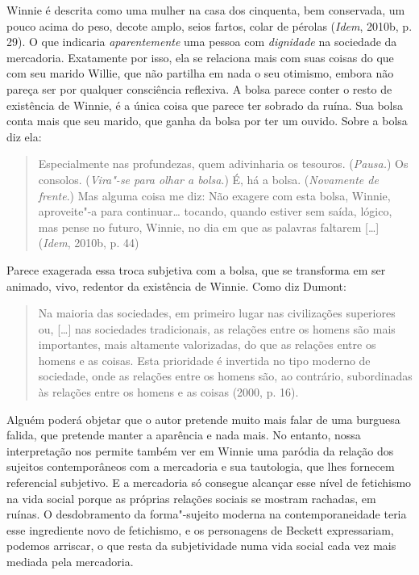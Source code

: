 {Winnie é descrita como uma mulher na casa dos cinquenta, bem conservada,
um pouco acima do peso, decote amplo, seios fartos, colar de pérolas
(\emph{Idem}, 2010b, p. 29). O que indicaria \emph{aparentemente} uma
pessoa com \emph{dignidade} na sociedade da mercadoria. Exatamente por
isso, ela se relaciona mais com suas coisas do que com seu marido
Willie, que não partilha em nada o seu otimismo, embora não pareça ser
por qualquer consciência reflexiva. A bolsa parece conter o resto de
existência de Winnie, é a única coisa que parece ter sobrado da ruína.
Sua bolsa conta mais que seu marido, que ganha da bolsa por ter um
ouvido. Sobre a bolsa diz ela:

\begin{quote}
Especialmente nas profundezas, quem adivinharia os tesouros.
(\emph{Pausa.}) Os consolos. (\emph{Vira"-se para olhar a bolsa}.) É, há
a bolsa. (\emph{Novamente de frente}.) Mas alguma coisa me diz: Não
exagere com esta bolsa, Winnie, aproveite"-a para continuar\ldots{} tocando,
quando estiver sem saída, lógico, mas pense no futuro, Winnie, no dia em
que as palavras faltarem [\ldots{}] (\emph{Idem}, 2010b, p. 44)
\end{quote}

Parece exagerada essa troca subjetiva com a bolsa, que se transforma em
ser animado, vivo, redentor da existência de Winnie. Como diz Dumont:

\begin{quote}
Na maioria das sociedades, em primeiro lugar nas civilizações superiores
ou, [\ldots{}] nas sociedades tradicionais, as relações entre os homens
são mais importantes, mais altamente valorizadas, do que as relações
entre os homens e as coisas. Esta prioridade é invertida no tipo moderno
de sociedade, onde as relações entre os homens são, ao contrário,
subordinadas às relações entre os homens e as coisas (2000, p. 16).
\end{quote}

Alguém poderá objetar que o autor pretende muito mais falar de uma
burguesa falida, que pretende manter a aparência e nada mais. No
entanto, nossa interpretação nos permite também ver em Winnie uma
paródia da relação dos sujeitos contemporâneos com a mercadoria e sua
tautologia, que lhes fornecem referencial subjetivo. E a mercadoria só
consegue alcançar esse nível de fetichismo na vida social porque as
próprias relações sociais se mostram rachadas, em ruínas. O
desdobramento da forma"-sujeito moderna na contemporaneidade teria esse
ingrediente novo de fetichismo, e os personagens de Beckett
expressariam, podemos arriscar, o que resta da subjetividade numa vida
social cada vez mais mediada pela mercadoria.

}
